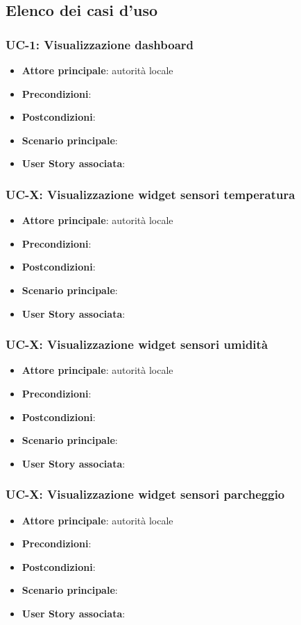 \documentclass[8pt]{article}
\begin{document}
\begin{itemize}
\subsection{Elenco dei casi d'uso}
\subsubsection{UC-1: Visualizzazione dashboard}
\begin{itemize}
    \item \textbf{Attore principale}: autorità locale
    \item \textbf{Precondizioni}:
    \item \textbf{Postcondizioni}:
    \item \textbf{Scenario principale}:
    \item \textbf{User Story associata}:
\end{itemize}

\subsubsection{UC-X: Visualizzazione widget sensori temperatura}
\begin{itemize}
    \item \textbf{Attore principale}: autorità locale
    \item \textbf{Precondizioni}:
    \item \textbf{Postcondizioni}:
    \item \textbf{Scenario principale}:
    \item \textbf{User Story associata}:
\end{itemize}

\subsubsection{UC-X: Visualizzazione widget sensori umidità}
\begin{itemize}
    \item \textbf{Attore principale}: autorità locale
    \item \textbf{Precondizioni}:
    \item \textbf{Postcondizioni}:
    \item \textbf{Scenario principale}:
    \item \textbf{User Story associata}:
\end{itemize}

\subsubsection{UC-X: Visualizzazione widget sensori parcheggio}
\begin{itemize}
    \item \textbf{Attore principale}: autorità locale
    \item \textbf{Precondizioni}:
    \item \textbf{Postcondizioni}:
    \item \textbf{Scenario principale}:
    \item \textbf{User Story associata}:
\end{itemize}


\end{itemize}
\end{document}
